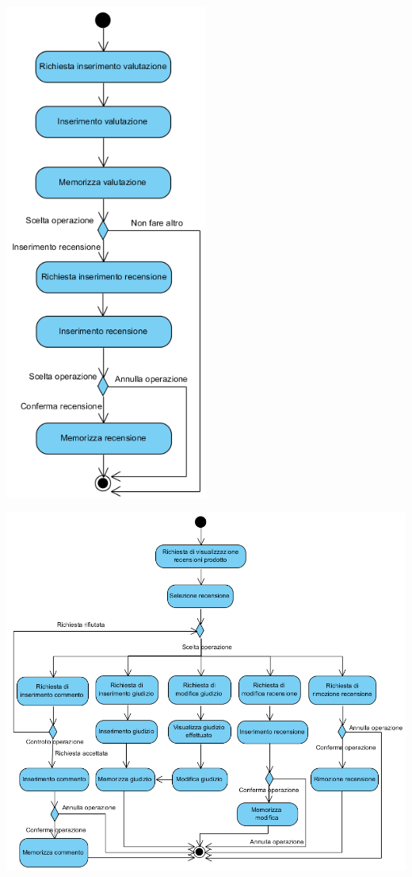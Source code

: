 \begin{center}
	\includegraphics[width=0.5\textwidth]{assets/visualParadigm/attivita/valutazioneRecensione}
\end{center}

\begin{center}
	\includegraphics[width=\textwidth]{assets/visualParadigm/attivita/mostraRecensioni}
\end{center}
\newpage

